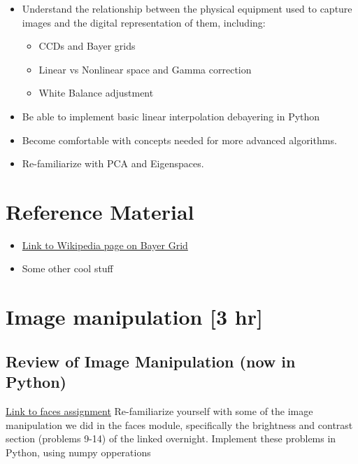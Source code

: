 \documentclass{tufte-handout}
\begin{document}
\begin{itemize}
\item Understand the relationship between the physical equipment used to capture
images and the digital representation of them, including:
    \begin{itemize}
        \item CCDs and Bayer grids
        \item Linear vs Nonlinear space and Gamma correction
        \item White Balance adjustment
    \end{itemize}
\item Be able to implement basic linear interpolation debayering in Python
\item Become comfortable with concepts needed for more advanced algorithms.
\item Re-familiarize with PCA and Eigenspaces.
\end{itemize}


\section{Reference Material}

\begin{itemize}
\item \href{https://en.wikipedia.org/wiki/Bayer_filter
}{Link to Wikipedia page on Bayer Grid}
\item Some other cool stuff
\end{itemize}

\section{Image manipulation [3 hr]}

\subsection{Review of Image Manipulation (now in Python)}
\href{https://drive.google.com/file/d/0B7LNBbaxYFujOHpEU2FDdkF6VEE/view
}{Link to faces assignment}
Re-familiarize yourself with some of the image manipulation we did in the faces module, specifically the brightness and contrast section (problems 9-14) of the linked overnight. Implement these problems in Python, using numpy opperations
\end{document}
